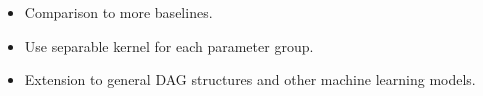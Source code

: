 \documentclass[landscape,a0b,final,a4resizeable]{include/a0poster}
\begin{document}
\begin{poster}
\begin{multicols}{3}

	\begin{itemize}
		\item Comparison to more baselines.
		\item Use separable kernel for each parameter group.
		\item Extension to general DAG structures and other machine learning models.
	\end{itemize}

%





\end{multicols}
\end{poster}
\end{document}
